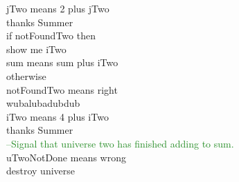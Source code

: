 \documentclass[preprint]{sigplanconf}
\begin{document}
{\indent \indent \indent \noindent jTwo means 2 plus jTwo \\

\indent \indent \noindent thanks Summer \\

\indent \indent \noindent if notFoundTwo then \\
\indent \indent \indent show me iTwo \\
\indent \indent \indent sum means sum plus iTwo \\
\indent \indent otherwise \\
\indent \indent \indent notFoundTwo means right \\
\indent \indent wubalubadubdub \\

\indent \indent \noindent iTwo means 4 plus iTwo \\
 
\indent \noindent thanks Summer \\

\textcolor{ForestGreen}{  --Signal that universe two has finished adding to sum.} \\
\indent uTwoNotDone means wrong \\

\noindent destroy universe \\
}
\end{document}
